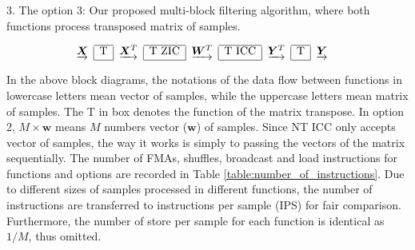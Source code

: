 3. The option 3: Our proposed multi-block filtering algori\-thm, where both functions process transposed matrix of samples. 

\begin{equation*}
    \label{eq:option_3}
    \begin{aligned}
        & \begin{array}{c|c|c|c|c|c|c|c|c}
            \cline{2-2}
            \cline{4-4}
            \cline{6-6}
            \cline{8-8}
            \underrightarrow{\bm{X}} & \text{T} & \underrightarrow{\bm{X}^T} & \text{T ZIC} & \underrightarrow{\bm{W}^T} & \text{T ICC} & \underrightarrow{\bm{Y}^T} & \text{T} & \underrightarrow{\bm{Y}} \\
            \cline{2-2}
            \cline{4-4}
            \cline{6-6}
            \cline{8-8}
    \end{array}
\end{aligned}
\end{equation*}

In the above block diagrams,
the notations of the data flow between functions in lowercase letters mean vector of samples,
while the uppercase letters mean matrix of samples. The T in box denotes the function of the matrix transpose.
In option 2, $M \times \bm{w}$ means $M$ numbers vector ($\bm{w}$) of samples.
Since NT ICC only accepts vector of samples, the way it works is simply to passing the vectors of the matrix sequentially. 
The number of FMAs, shuffles, broadcast and load instructions for functions 
and options are recorded in Table \ref{table:number_of_instructions}.
Due to different sizes of samples processed in different functions, 
the number of instructions are transferred to instructions per sample (IPS) for fair comparison.
Furthermore, the number of store per sample for each function is identical as $1/M$, thus omitted. 


